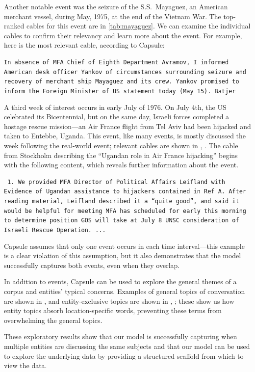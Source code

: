 Another notable event was the seizure of the S.S.~Mayaguez, an
American merchant vessel, during May, 1975, at the end of the Vietnam
War. The top-ranked cables for this event are in
\cref{tab:mayaguez}. We can examine the individual cables to confirm
their relevancy and learn more about the event. For example, here is
the most relevant cable, according to Capsule:
\begin{shaded*} \tt{In absence of MFA Chief of Eighth Department Avramov, I
informed American desk officer Yankov of circumstances surrounding seizure
and recovery of merchant ship Mayaguez and its crew.  Yankov promised to
inform the Foreign Minister of US statement today  (May 15).
Batjer
}
\end{shaded*}


A third week of interest occurs in early July of 1976.  On July 4th, the US celebrated its Bicentennial, but on the same day, Israeli forces completed a hostage rescue mission---an Air France flight from Tel Aviv had been hijacked and taken to Entebbe, Uganda.  This event, like many events, is mostly discussed the week following the real-world event; relevant cables are shown in , .
The cable from Stockholm describing the ``Ugandan role in Air France hijacking'' begins with the following content, which reveals further information about the event.
\begin{shaded*} \tt{
1. We provided MFA Director of Political Affairs
Leifland with Evidence of Ugandan assistance to
hijackers contained in Ref A.  After reading material,{}
Leifland described it a ``quite good'', and said it{}
would be helpful for meeting MFA has scheduled for
early this morning to determine position GOS will take
at July 8 UNSC consideration of Israeli Rescue Operation. ...
}
\end{shaded*}
Capsule assumes that only one event occurs in each time interval---this example is a clear violation of this assumption, but it also demonstrates that the model successfully captures both events, even when they overlap.


In addition to events, Capsule can be used to explore the general themes of a corpus and entities' typical concerns.  Examples of general topics of conversation are shown in ,  and entity-exclusive topics are shown in , ; these show us how entity topics absorb location-specific words, preventing these terms from overwhelming the general topics.

These exploratory results show that our model is successfully capturing when multiple entities are discussing the same subjects and that our model can be used to explore the underlying data by providing a structured scaffold from which to view the data.
